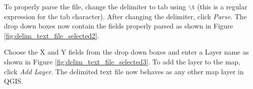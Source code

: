 To properly parse the file, change the delimiter to
tab using \mbox{$\backslash$}t (this is a regular expression for the tab
character). After changing the delimiter, click {\em Parse}.
The drop down boxes now contain the fields properly parsed as shown in Figure
\ref{fig:delim_text_file_selected2}.


Choose the X and Y fields from the drop
down boxes and enter a Layer name as shown in Figure
\ref{fig:delim_text_file_selected3}. To add the layer to the
map, click {\em Add Layer}. The delimited text file now behaves as any other
map layer in QGIS.

